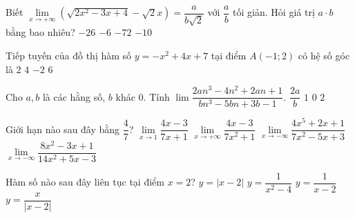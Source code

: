 \begin{ex}%
	Biết $\lim\limits_{x\to +\infty}\left(\sqrt{2x^2-3x+4}-\sqrt{2}x\right)=\dfrac{a}{b\sqrt{2}}$ với $\dfrac{a}{b}$ tối giản. Hỏi giá trị $a\cdot b$ bằng bao nhiêu?
	\choice
	{$-26$}
	{\True $-6$}
	{$-72$}
	{$-10$}
\end{ex}
\begin{ex}%
	Tiếp tuyến của đồ thị hàm số $y=-x^2+4x+7$ tại điểm $A(-1;2)$ có hệ số góc là
	\choice
	{$2$}
	{$4$}
	{$-2$}
	{\True $6$}
\end{ex}
\begin{ex}%
	Cho $a,b$ là các hằng số, $b$ khác $0$. Tính $\lim\limits\dfrac{2an^3-4n^2+2an+1}{bn^3-5bn+3b-1}$.
	\choice
	{\True $\dfrac{2a}{b}$}
	{$1$}
	{$0$}
	{$2$}
\end{ex}
\begin{ex}%
	Giới hạn nào sau đây bằng $\dfrac{4}{7}$?
	\choice
	{$\lim\limits_{x\to 1}\dfrac{4x-3}{7x+1}$}
	{$\lim\limits_{x\to +\infty}\dfrac{4x-3}{7x^2+1}$}
	{$\lim\limits_{x\to -\infty}\dfrac{4x^5+2x+1}{7x^2-5x+3}$}
	{\True $\lim\limits_{x\to -\infty}\dfrac{8x^2-3x+1}{14x^2+5x-3}$}
\end{ex}
\begin{ex}%
	Hàm số nào sau đây liên tục tại điểm $x=2$?
	\choice
	{\True $y=\left|x-2\right|$}
	{$y=\dfrac{1}{x^2-4}$}
	{$y=\dfrac{1}{x-2}$}
	{$y=\dfrac{x}{\left|x-2\right|}$}
\end{ex}
